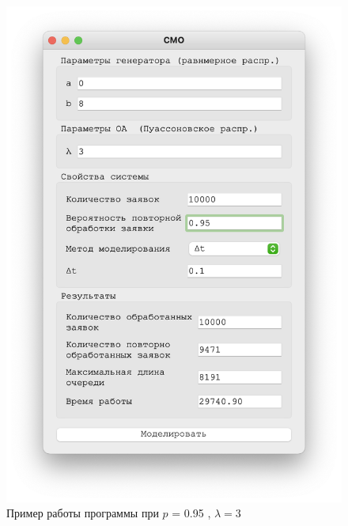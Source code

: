 \begin{figure}[!htb]
\begin{minipage}{0.55\textwidth}
      \includegraphics[width=1\linewidth]{3-95-t}
    \end{minipage}
    \caption{Пример работы программы при $p$ = 0.95 , $\lambda = 3$}
 \end{figure}


